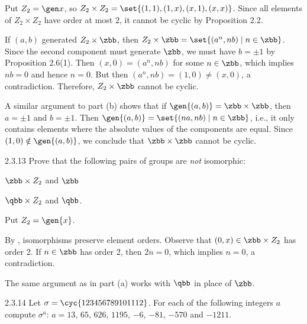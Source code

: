 \begin{solenum}
    \item Put $Z_2 = \gen x$, so $Z_2 \times Z_2 = \set{(1, 1), (1, x), (x, 1), (x, x)}$.
    Since all elements of $Z_2 \times Z_2$ have order at most $2$, it cannot be cyclic by Proposition 2.2.
    \item If $(a, b)$ generated $Z_2 \times \zbb$, then $Z_2 \times \zbb = \set{(a^n, nb) \mid n \in \zbb}$.
    Since the second component must generate $\zbb$, we must have $b = \pm 1$ by Proposition 2.6(1).
    Then $(x, 0) = (a^n, nb)$ for some $n \in \zbb$, which implies $nb = 0$ and hence $n = 0$.
    But then $(a^n, nb) = (1, 0) \neq (x, 0)$, a contradiction.
    Therefore, $Z_2 \times \zbb$ cannot be cyclic.
    \item A similar argument to part (b) shows that if $\gen{(a, b)} = \zbb \times \zbb$, then $a = \pm 1$ and $b = \pm 1$.
    Then $\gen{(a, b)} = \set{(na, nb) \mid n \in \zbb}$, i.e., it only contains elements where the absolute values of the components are equal.
    Since $(1, 0) \notin \gen{(a, b)}$, we conclude that $\zbb \times \zbb$ cannot be cyclic.
\end{solenum}

\begin{exercise}{2.3.13}
    Prove that the following pairs of groups are \emph{not} isomorphic:
    \begin{subexercises}
        \item $\zbb \times Z_2$ and $\zbb$
        \item $\qbb \times Z_2$ and $\qbb$.
    \end{subexercises}
\end{exercise}

\begin{sol}
    Put $Z_2 = \gen{x}$.
    \begin{subexercises}
        \item By , isomorphisms preserve element orders.
        Observe that $(0, x) \in \zbb \times Z_2$ has order 2.
        If $n \in \zbb$ has order 2, then $2n = 0$, which implies $n = 0$, a contradiction.
        \item The same argument as in part (a) works with $\qbb$ in place of $\zbb$. \qedhere
    \end{subexercises}
\end{sol}

\begin{exercise}{2.3.14}
    Let $\sigma = \cyc{1 2 3 4 5 6 7 8 9 10 11 12}$.
	For each of the following integers $a$ compute $\sigma^a$: $a = 13$, $65$, $626$, $1195$, $-6$, $-81$, $-570$ and $-1211$.
\end{exercise}

